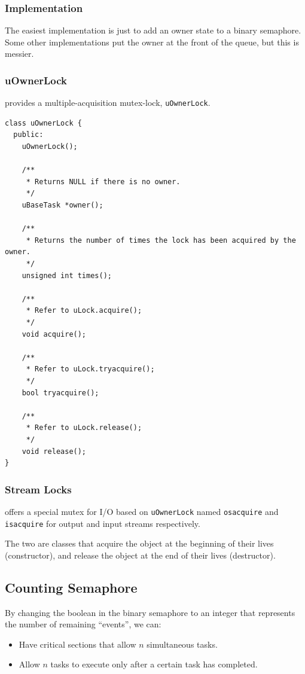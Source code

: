                 \subsubsection{Implementation} %
                \label{ssub:implementation}
                    The easiest implementation is just to add an owner state to a binary semaphore.
                    Some other implementations put the owner at the front of the queue, but this is messier.
                \subsubsection{uOwnerLock} %
                \label{ssub:uownerlock}
                    \uC provides a multiple-acquisition mutex-lock, \verb|uOwnerLock|.
                    \begin{lstlisting}
class uOwnerLock {
  public:
    uOwnerLock();

    /**
     * Returns NULL if there is no owner.
     */
    uBaseTask *owner();

    /**
     * Returns the number of times the lock has been acquired by the owner.
     */
    unsigned int times();

    /**
     * Refer to uLock.acquire();
     */
    void acquire();

    /**
     * Refer to uLock.tryacquire();
     */
    bool tryacquire();

    /**
     * Refer to uLock.release();
     */
    void release();
}
                    \end{lstlisting}
                \subsubsection{Stream Locks} %
                \label{ssub:stream_locks}
                    \uC offers a special mutex for I/O based on \verb|uOwnerLock| named \verb|osacquire| and \verb|isacquire| for output and input streams respectively.

                    The two are classes that acquire the object at the beginning of their lives (constructor), and release the object at the end of their lives (destructor).
            \subsection{Counting Semaphore} %
            \label{sub:counting_semaphore}
                By changing the boolean in the binary semaphore to an integer that represents the number of remaining ``events'', we can:
                \begin{itemize}
                    \item Have critical sections that allow $n$ simultaneous tasks.
                    \item Allow $n$ tasks to execute only after a certain task has completed.
                \end{itemize}

